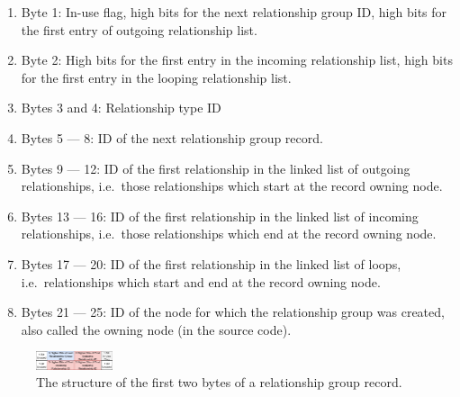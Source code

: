                 \begin{enumerate}
                    \item Byte 1: In-use flag, high bits for the next relationship group ID, high bits for the first entry of outgoing relationship list.
                    \item Byte 2: High bits for the first entry in the incoming relationship list, high bits for the first entry in the looping relationship list.
                    \item Bytes 3 and 4: Relationship type ID
                    \item Bytes 5 --- 8: ID of the next relationship group record.
                    \item Bytes 9 --- 12: ID of the first relationship in the linked list of outgoing relationships, i.e.\ those relationships which start at the record owning node.
                    \item Bytes 13 --- 16: ID of the first relationship in the linked list of incoming relationships, i.e.\ those relationships which end at the record owning node.
                    \item Bytes 17 --- 20: ID of the first relationship in the linked list of loops, i.e.\ relationships which start and end at the record owning node.
                    \item Bytes 21 --- 25: ID of the node for which the relationship group was created, also called the owning node (in the source code).
                \end{enumerate}
                
                \begin{figure}[htp]\label{rel_group_first_bytes}
                    \begin{center}
                        \includegraphics[keepaspectratio,height=0.2\textheight,width=0.2\textwidth]{img/03_record/relationship/relationship_group_first_bytes.png}
                    \end{center}
                    \caption{The structure of the first two bytes of a relationship group record.} %
                \end{figure}
            

